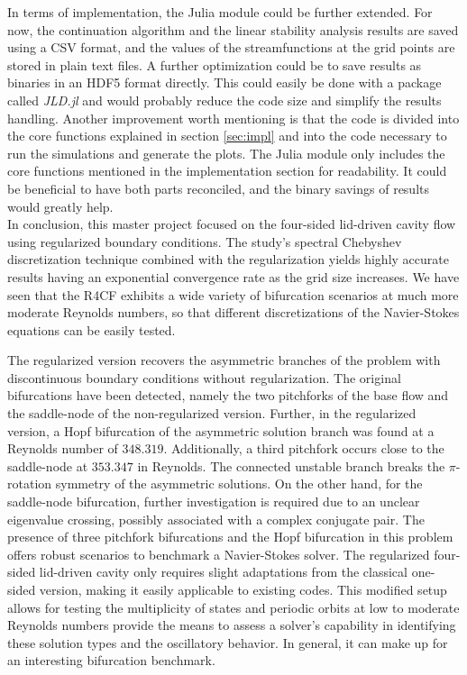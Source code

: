 In terms of implementation, the Julia module could be further extended. For
now, the continuation algorithm and the linear stability analysis results are
saved using a CSV format, and the values of the streamfunctions at the grid
points are stored in plain text files. A further optimization could be to save
results as binaries in an HDF5 format directly. This could easily be done with
a package called \emph{JLD.jl} and would probably reduce the code size and
simplify the results handling. Another improvement worth mentioning is that the
code is divided into the core functions explained in section \ref{sec:impl} and
into the code necessary to run the simulations and generate the plots. The
Julia module only includes the core functions mentioned in the implementation
section for readability. It could be beneficial to have both parts reconciled,
and the binary savings of results would greatly help. \\

In conclusion, this master project focused on the four-sided lid-driven cavity
flow using regularized boundary conditions. The study's spectral Chebyshev
discretization technique combined with the regularization yields highly
accurate results having an exponential convergence rate as the grid size
increases. We have seen that the R4CF exhibits a wide variety of bifurcation
scenarios at much more moderate Reynolds numbers, so that different
discretizations of the Navier-Stokes equations can be easily tested.

The regularized version recovers the asymmetric branches of the problem with
discontinuous boundary conditions without regularization. The original
bifurcations have been detected, namely the two pitchforks of the base flow and
the saddle-node of the non-regularized version. Further, in the regularized
version, a Hopf bifurcation of the asymmetric solution branch was found at a
Reynolds number of $348.319$. Additionally, a third pitchfork occurs close to
the saddle-node at $353.347$ in Reynolds. The connected unstable branch breaks
the $\pi$-rotation symmetry of the asymmetric solutions. On the other hand, for
the saddle-node bifurcation, further investigation is required due to an
unclear eigenvalue crossing, possibly associated with a complex conjugate pair.
The presence of three pitchfork bifurcations and the Hopf bifurcation in this
problem offers robust scenarios to benchmark a Navier-Stokes solver. The
regularized four-sided lid-driven cavity only requires slight adaptations from
the classical one-sided version, making it easily applicable to existing codes.
This modified setup allows for testing the multiplicity of states and periodic
orbits at low to moderate Reynolds numbers provide the means to assess a
solver's capability in identifying these solution types and the oscillatory
behavior. In general, it can make up for an interesting bifurcation benchmark.
